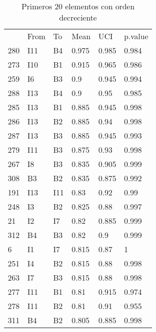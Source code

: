 \begin{table}[]
\centering
\caption{Primeros 20 elementos con orden decreciente}
\label{tab: directGRANDE}
\begin{tabular}{llllll}
    & From & To  & Mean  & UCI   & p.value \\
280 & I11  & B4  & 0.975 & 0.985 & 0.984   \\
273 & I10  & B1  & 0.915 & 0.965 & 0.986   \\
259 & I6   & B3  & 0.9   & 0.945 & 0.994   \\
288 & I13  & B4  & 0.9   & 0.95  & 0.985   \\
285 & I13  & B1  & 0.885 & 0.945 & 0.998   \\
286 & I13  & B2  & 0.885 & 0.94  & 0.998   \\
287 & I13  & B3  & 0.885 & 0.945 & 0.993   \\
279 & I11  & B3  & 0.875 & 0.93  & 0.998   \\
267 & I8   & B3  & 0.835 & 0.905 & 0.999   \\
308 & B3   & B2  & 0.835 & 0.875 & 0.992   \\
191 & I13  & I11 & 0.83  & 0.92  & 0.99    \\
248 & I3   & B2  & 0.825 & 0.88  & 0.997   \\
21  & I2   & I7  & 0.82  & 0.885 & 0.999   \\
312 & B4   & B3  & 0.82  & 0.9   & 0.999   \\
6   & I1   & I7  & 0.815 & 0.87  & 1       \\
251 & I4   & B2  & 0.815 & 0.88  & 0.998   \\
263 & I7   & B3  & 0.815 & 0.88  & 0.998   \\
277 & I11  & B1  & 0.81  & 0.915 & 0.974   \\
278 & I11  & B2  & 0.81  & 0.91  & 0.955   \\
311 & B4   & B2  & 0.805 & 0.885 & 0.998  
\end{tabular}
\end{table}
